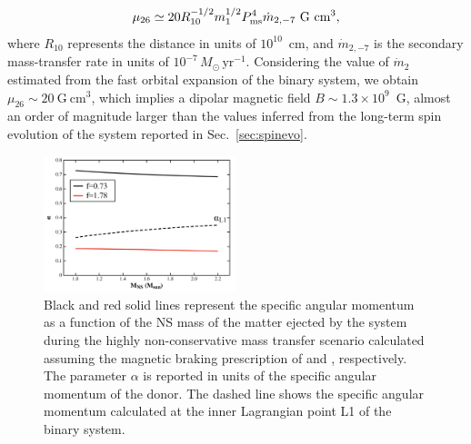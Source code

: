\documentclass[fleqn,usenatbib]{mnras}
\begin{document}
\begin{equation}           
\mu_{26}\simeq20 R^{-1/2}_{10} m_1^{1/2}P^4_{\rm ms}\dot{m}_{2,-7} ~\text{G}~\text{cm}^3,
\end{equation}
where $R_{10}$ represents the distance in units of $10^{10}$~cm, and $\dot{m}_{2,-7}$ is the secondary mass-transfer rate in units of $10^{-7}\,{M}_\odot\,\text{yr}^{-1}$. Considering the value of $\dot{m}_2$ estimated from the fast orbital expansion of the binary system, we obtain $\mu_{26}\sim 20~\text{G}~\text{cm}^3$, which implies a dipolar magnetic field $B\sim 1.3\times 10^9$~G, almost an order of magnitude larger than the values inferred from the long-term spin evolution of the system reported in Sec.~\ref{sec:spinevo}.
\begin{figure}
\centering
\includegraphics[width=0.5\textwidth]{alpha_vs_m1_non_conservative}
\caption{Black and red solid lines represent the specific angular momentum as a function of the NS mass of the matter ejected by the system during the highly non-conservative mass transfer scenario calculated assuming the magnetic braking prescription of \citet[][f=0.73]{Skumanich:1972vy} and \citet[][f=1.78]{Smith:1979vn}, respectively. The parameter $\alpha$ is reported in units of the specific angular momentum of the donor. The dashed line shows the specific angular momentum calculated at the inner Lagrangian point L1 of the binary system.}
\label{fig:alpha}
\end{figure} 


\end{document}
